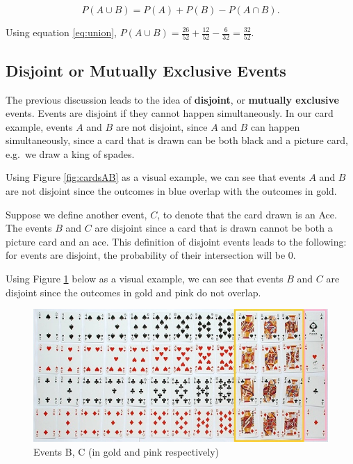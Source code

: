 \documentclass[
]{book}
\begin{document}
\begin{equation} 
P(A \cup B) = P(A) + P(B) - P(A \cap B).
\label{eq:union}
\end{equation}

Using equation \eqref{eq:union}, \(P(A \cup B) = \frac{26}{52} + \frac{12}{52} - \frac{6}{32} = \frac{32}{52}\).

\subsection{Disjoint or Mutually Exclusive Events}\label{disjoint-or-mutually-exclusive-events}

The previous discussion leads to the idea of \textbf{disjoint}, or \textbf{mutually exclusive} events. Events are disjoint if they cannot happen simultaneously. In our card example, events \(A\) and \(B\) are not disjoint, since \(A\) and \(B\) can happen simultaneously, since a card that is drawn can be both black and a picture card, e.g.~we draw a king of spades.

Using Figure \ref{fig:cardsAB} as a visual example, we can see that events \(A\) and \(B\) are not disjoint since the outcomes in blue overlap with the outcomes in gold.

Suppose we define another event, \(C\), to denote that the card drawn is an Ace. The events \(B\) and \(C\) are disjoint since a card that is drawn cannot be both a picture card and an ace. This definition of disjoint events leads to the following: for events are disjoint, the probability of their intersection will be 0.

Using Figure \ref{fig:cardsBC} below as a visual example, we can see that events \(B\) and \(C\) are disjoint since the outcomes in gold and pink do not overlap.

\begin{figure}
\centering
\includegraphics{images/02-cardsBC.jpg}
\caption{\label{fig:cardsBC}Events B, C (in gold and pink respectively)}
\end{figure}
\end{document}
